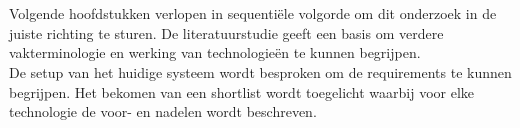 
\chapter{}%
\label{ch:methodologie}


Volgende hoofdstukken verlopen in sequentiële volgorde om dit onderzoek in de juiste richting te sturen.
De literatuurstudie geeft een basis om verdere vakterminologie en werking van technologieën te kunnen begrijpen.
\\
De setup van het huidige systeem wordt besproken om de requirements te kunnen begrijpen.
Het bekomen van een shortlist wordt toegelicht waarbij voor elke technologie de voor- en nadelen wordt beschreven.


